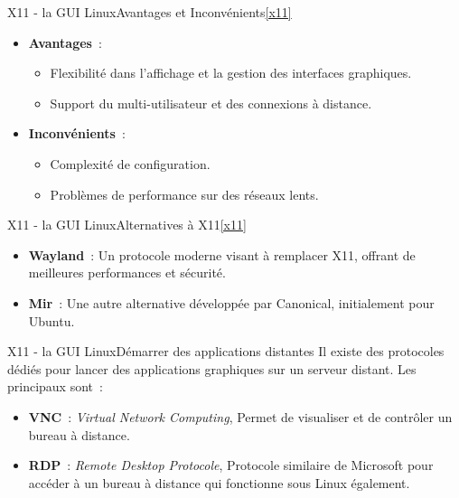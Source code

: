 \documentclass{beamer}
\begin{document}
    \begin{frame}{X11 - la GUI Linux}{Avantages et Inconvénients\cref{x11}}
        \begin{itemize}
            \item \textbf{Avantages}~:
            \begin{itemize}
                \item Flexibilité dans l'affichage et la gestion des interfaces graphiques.
                \item Support du multi-utilisateur et des connexions à distance.
            \end{itemize}
            \item \textbf{Inconvénients}~:
            \begin{itemize}
                \item Complexité de configuration.
                \item Problèmes de performance sur des réseaux lents.
            \end{itemize}
        \end{itemize}
    \end{frame}

    \begin{frame}{X11 - la GUI Linux}{Alternatives à X11\cref{x11}}
        \begin{itemize}
            \item \textbf{Wayland}~: Un protocole moderne visant à remplacer X11, offrant de meilleures performances et sécurité.
            \item \textbf{Mir}~: Une autre alternative développée par Canonical, initialement pour Ubuntu.
        \end{itemize}
    \end{frame}

    \begin{frame}{X11 - la GUI Linux}{Démarrer des applications distantes}
        Il existe des protocoles dédiés pour lancer des applications graphiques sur un serveur distant.
        Les principaux sont~:
        \begin{itemize}
            \item \textbf{VNC}~: \textit{Virtual Network Computing}, Permet de visualiser et de contrôler un bureau à distance.
            \item \textbf{RDP}~: \textit{Remote Desktop Protocole}, Protocole similaire de Microsoft pour accéder à un bureau à distance qui fonctionne sous Linux également.
        \end{itemize}
    \end{frame}
\end{document}
